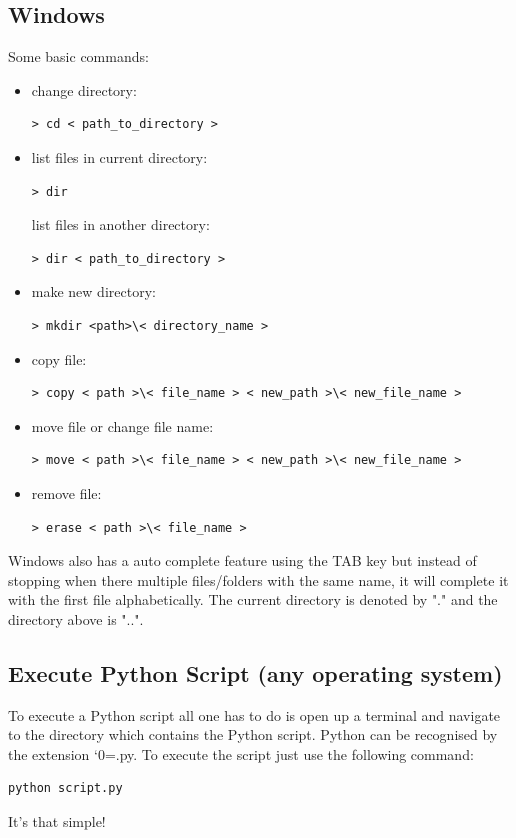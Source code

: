 \documentclass{SciPost}
\newcommand\0{\scalebox{-1}[1]{0}}
\let\svttfamily\ttfamily
\renewcommand\ttfamily{\svttfamily\catcode`0=\active }
\renewcommand\texttt{\bgroup\ttfamily\texttthelp}
\def\texttthelp#1{#1\egroup}
\begin{document}
\begin{appendix}
\subsection{Windows}
Some basic commands:

\begin{itemize}
	\item change directory:
	\begin{lstlisting}[numbers=none,keywordstyle=\ttfamily]
	> cd < path_to_directory >
	\end{lstlisting}
	\item list files in current directory:
	\begin{lstlisting}[numbers=none,keywordstyle=\ttfamily]
	> dir
	\end{lstlisting}
	list files in another directory:
	\begin{lstlisting}[numbers=none,keywordstyle=\ttfamily]
	> dir < path_to_directory >
	\end{lstlisting}
	\item make new directory:
	\begin{lstlisting}[numbers=none,keywordstyle=\ttfamily]
	> mkdir <path>\< directory_name >
	\end{lstlisting}
	\item copy file:
	\begin{lstlisting}[numbers=none,keywordstyle=\ttfamily]
	> copy < path >\< file_name > < new_path >\< new_file_name >
	\end{lstlisting}
	\item move file or change file name:
	\begin{lstlisting}[numbers=none,keywordstyle=\ttfamily]
	> move < path >\< file_name > < new_path >\< new_file_name >
	\end{lstlisting}
	\item remove file:
	\begin{lstlisting}[numbers=none,keywordstyle=\ttfamily]
	> erase < path >\< file_name >
	\end{lstlisting}
	
\end{itemize}
Windows also has a auto complete feature using the TAB key but instead of stopping when there multiple files/folders with the same name, it will complete it with the first file alphabetically. The current directory is denoted by "." and the directory above is "..".

\subsection{Execute Python Script (any operating system)}
%
To execute a Python script all one has to do is open up a terminal and navigate to the directory which contains the Python script. Python can be recognised by the extension \texttt{.py}. To execute the script just use the following command:
\begin{lstlisting}[numbers=none,keywordstyle=\ttfamily]
python script.py
\end{lstlisting}
It's that simple!


\end{appendix}
\end{document}
